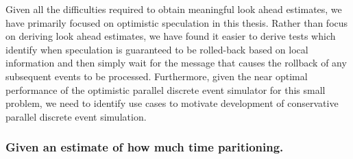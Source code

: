 \documentclass[10pt,letterpaper]{article}
\begin{document}
Given all the difficulties required to obtain meaningful look ahead estimates, we have primarily focused on optimistic speculation in this thesis. Rather than focus on deriving look ahead estimates, we have found it easier to derive tests which identify when speculation is guaranteed to be rolled-back based on local information and then simply wait for the message that causes the rollback of any subsequent events to be processed. Furthermore, given the near optimal performance of the optimistic parallel discrete event simulator for this small problem, we need to identify use cases to motivate development of conservative parallel discrete event simulation.


\subsubsection*{Given an estimate of how much time paritioning.}
\end{document}
